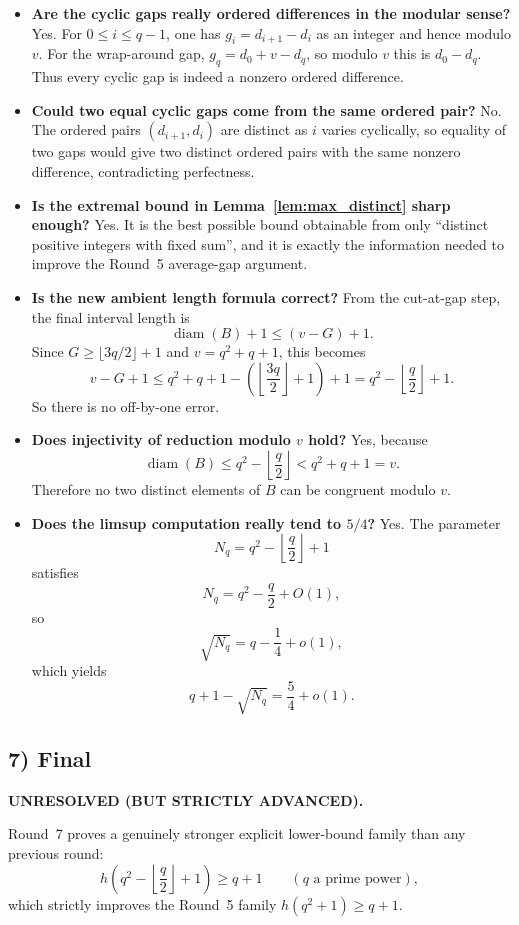 \begin{itemize}
\item \textbf{Are the cyclic gaps really ordered differences in the modular sense?}
Yes. For $0\le i\le q-1$, one has $g_i=d_{i+1}-d_i$ as an integer and hence modulo $v$.
For the wrap-around gap, $g_q=d_0+v-d_q$, so modulo $v$ this is $d_0-d_q$.
Thus every cyclic gap is indeed a nonzero ordered difference.

\item \textbf{Could two equal cyclic gaps come from the same ordered pair?}
No. The ordered pairs $(d_{i+1},d_i)$ are distinct as $i$ varies cyclically, so equality of two gaps would give two distinct ordered pairs with the same nonzero difference, contradicting perfectness.

\item \textbf{Is the extremal bound in Lemma~\ref{lem:max_distinct} sharp enough?}
Yes. It is the best possible bound obtainable from only ``distinct positive integers with fixed sum'', and it is exactly the information needed to improve the Round~5 average-gap argument.

\item \textbf{Is the new ambient length formula correct?}
From the cut-at-gap step, the final interval length is
\[
\operatorname{diam}(B)+1\le (v-G)+1.
\]
Since $G\ge \lfloor 3q/2\rfloor+1$ and $v=q^2+q+1$, this becomes
\[
v-G+1\le q^2+q+1-\left(\left\lfloor\frac{3q}{2}\right\rfloor+1\right)+1
      =q^2-\left\lfloor\frac q2\right\rfloor+1.
\]
So there is no off-by-one error.

\item \textbf{Does injectivity of reduction modulo $v$ hold?}
Yes, because
\[
\operatorname{diam}(B)\le q^2-\left\lfloor \frac q2\right\rfloor < q^2+q+1=v.
\]
Therefore no two distinct elements of $B$ can be congruent modulo $v$.

\item \textbf{Does the limsup computation really tend to $5/4$?}
Yes. The parameter
\[
N_q=q^2-\left\lfloor \frac q2\right\rfloor+1
\]
satisfies
\[
N_q=q^2-\frac q2+O(1),
\]
so
\[
\sqrt{N_q}=q-\frac14+o(1),
\]
which yields
\[
q+1-\sqrt{N_q}=\frac54+o(1).
\]
\end{itemize}

\subsection{7) Final}
\textbf{UNRESOLVED (BUT STRICTLY ADVANCED).}

Round~7 proves a genuinely stronger explicit lower-bound family than any previous round:
\[
h\!\left(q^2-\left\lfloor \frac q2\right\rfloor+1\right)\ge q+1
\qquad(q\text{ a prime power}),
\]
which strictly improves the Round~5 family $h(q^2+1)\ge q+1$.

